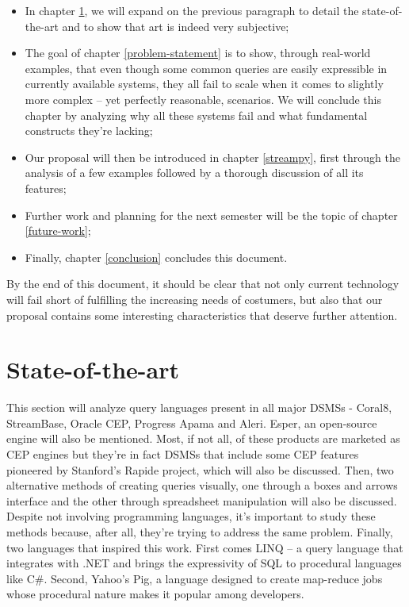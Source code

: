 \documentclass[twoside]{report}
\begin{document}
\begin{itemize}
\item In chapter \ref{state-of-the-art}, we will expand on the previous paragraph to detail the state-of-the-art and to show that art is indeed very subjective;
\item The goal of chapter \ref{problem-statement} is to show, through real-world examples, that even though some common queries are easily expressible in currently available systems, they all fail to scale when it comes to slightly more complex -- yet perfectly reasonable, scenarios. We will conclude this chapter by analyzing why all these systems fail and what fundamental constructs they're lacking;
\item Our proposal will then be introduced in chapter \ref{streampy}, first through the analysis of a few examples followed by a thorough discussion of all its features;
\item Further work and planning for the next semester will be the topic of chapter \ref{future-work};
\item Finally, chapter \ref{conclusion} concludes this document.
\end{itemize}

By the end of this document, it should be clear that not only current technology will fail short of fulfilling the increasing needs of costumers, but also that our proposal contains some interesting characteristics that deserve further attention.

\chapter{State-of-the-art}\label{state-of-the-art}

This section will analyze query languages present in all major DSMSs - Coral8, StreamBase, Oracle CEP, Progress Apama and Aleri. Esper, an open-source engine will also be mentioned. Most, if not all, of these products are marketed as CEP engines but they're in fact DSMSs that include some CEP features pioneered by Stanford's Rapide project, which will also be discussed. Then, two alternative methods of creating queries visually, one through a boxes and arrows interface and the other through spreadsheet manipulation will also be discussed. Despite not involving programming languages, it's important to study these methods because, after all, they're trying to address the same problem. Finally, two languages that inspired this work. First comes LINQ -- a query language that integrates with .NET and brings the expressivity of SQL to procedural languages like C\#. Second, Yahoo's Pig, a language designed to create map-reduce jobs whose procedural nature makes it popular among developers.
\end{document}
